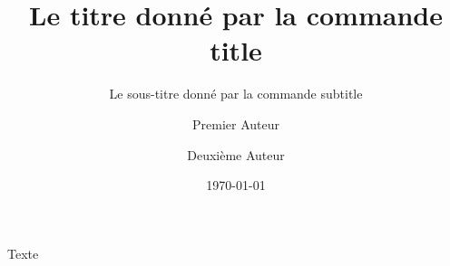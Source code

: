 \documentclass[%
	frenchb,
	titlepage,%
]{scrartcl}
\title{Le titre donné par la commande title}
\subtitle{Le sous-titre donné par la commande subtitle}
\author{Premier Auteur \and Deuxième Auteur}
\date{\today}
\begin{document}
\maketitle

Texte
\end{document}
